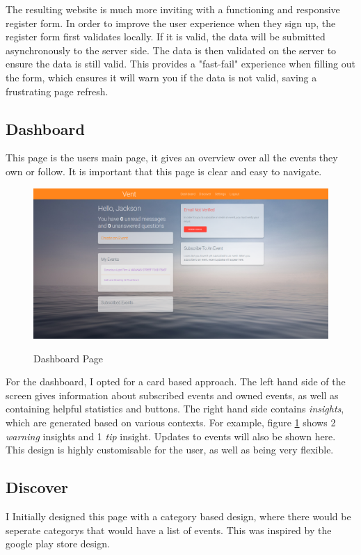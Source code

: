 \documentclass[a4paper,oneside,12pt,draft]{report}
\begin{document}
	The resulting website is much more inviting with a functioning and responsive register form. In order to improve the user experience when they sign up, the register form first validates locally. If it is valid, the data will be submitted asynchronously to the server side. The data is then validated on the server to ensure the data is still valid. This provides a "fast-fail" experience when filling out the form, which ensures it will warn you if the data is not valid, saving a frustrating page refresh.

	\subsection{Dashboard}
	This page is the users main page, it gives an overview over all the events they own or follow. It is important that this page is clear and easy to navigate.

	\begin{figure}[H]
		\caption{Dashboard Page}
		\includegraphics[width=\linewidth]{static/front-end3.png}
		\label{fig:dashboard}
	\end{figure}

	For the dashboard, I opted for a card based approach. The left hand side of the screen gives information about subscribed events and owned events, as well as containing helpful statistics and buttons. The right hand side contains \textit{insights}, which are generated based on various contexts. For example, figure \ref{fig:dashboard} shows 2 \textit{warning} insights and 1 \textit{tip} insight. Updates to events will also be shown here. This design is highly customisable for the user, as well as being very flexible.

	\subsection{Discover}
	I Initially designed this page with a category based design, where there would be seperate categorys that would have a list of events. This was inspired by the google play store design.
	
\end{document}
